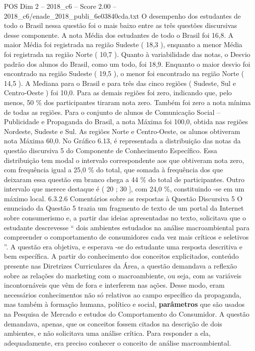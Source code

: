 \begin{textsample}{POS Dim 2 – 2018\_c6 – Score 2.00 – 2018\_c6/enade\_2018\_publi\_6e03840cda.txt}
O desempenho dos estudantes de todo o Brasil nessa questão foi o mais baixo entre as três questões discursivas desse componente.
A nota Média dos estudantes de todo o Brasil foi 16,8.
A maior Média foi registrada na região Sudeste ( 18,3 ), enquanto a menor Média foi registrada na região Norte ( 10,7 ).
Quanto à variabilidade das notas, o Desvio padrão dos alunos do Brasil, como um todo, foi 18,9.
Enquanto o maior desvio foi encontrado na região Sudeste ( 19,5 ), o menor foi encontrado na região Norte ( 14,5 ).
A Mediana para o Brasil e para três das cinco regiões ( Sudeste, Sul e Centro-Oeste ) foi 10,0.
Para as demais regiões foi zero, indicando que, pelo menos, 50 \% dos participantes tiraram nota zero.
Também foi zero a nota mínima de todas as regiões.
Para o conjunto de alunos de Comunicação Social – Publicidade e Propaganda do Brasil, a nota Máxima foi 100,0, obtida nas regiões Nordeste, Sudeste e Sul.
As regiões Norte e Centro-Oeste, os alunos obtiveram nota Máxima 60,0.
No Gráfico 6.13, é representada a distribuição das notas da questão discursiva 5 do Componente de Conhecimento Específico.
Essa distribuição tem modal o intervalo correspondente aos que obtiveram nota zero, com frequência igual a 25,0 \% do total, que somada à frequência dos que deixaram essa questão em branco chega a 44 \% do total de participantes.
Outro intervalo que merece destaque é ( 20 ; 30 ], com 24,0 \%, constituindo -se em um máximo local. 6.3.2.6 Comentários sobre as respostas à Questão Discursiva 5 O enunciado da Questão 5 trazia um fragmento de texto de um portal da Internet sobre consumerismo e, a partir das ideias apresentadas no texto, solicitava que o estudante descrevesse “ dois ambientes estudados na análise macroambiental para compreender o comportamento de consumidores cada vez mais críticos e seletivos ”.
A questão era objetiva, e esperava -se do estudante uma resposta descritiva e bem específica.
A partir do conhecimento dos conceitos explicitados, conteúdo presente nas Diretrizes Curriculares da Área, a questão demandava a reflexão sobre as relações do marketing com o macroambiente, ou seja, com as variáveis incontornáveis que vêm de fora e interferem nas ações.
Desse modo, eram necessários conhecimentos não só relativos ao campo específico da propaganda, mas também à formação humana, político e social, \textbf{parâmetros} que são usados na Pesquisa de Mercado e estudos do Comportamento do Consumidor.
A questão demandava, apenas, que os conceitos fossem citados na descrição de dois ambientes, e não solicitava uma análise crítica.
Para responder a ela, adequadamente, era preciso conhecer o conceito de análise macroambiental.

\end{textsample}
